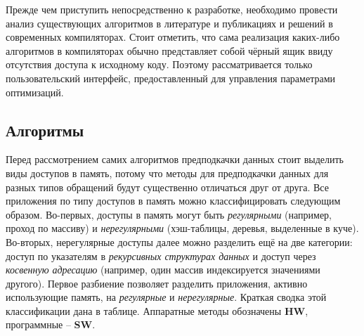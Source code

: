 \documentclass[12pt,a4paper]{article}
\begin{document}
\indent

Прежде чем приступить непосредственно к разработке, необходимо провести анализ существующих алгоритмов в литературе и публикациях и решений в современных компиляторах. Стоит отметить, что сама реализация каких-либо алгоритмов в компиляторах обычно представляет собой чёрный ящик ввиду отсутствия доступа к исходному коду. Поэтому рассматривается только пользовательский интерфейс, предоставленный для управления параметрами оптимизаций.

\subsection{Алгоритмы}

\indent

Перед рассмотрением самих алгоритмов предподкачки данных стоит выделить виды доступов в память, потому что методы для предподкачки данных для разных типов обращений будут существенно отличаться друг от друга. Все приложения по типу доступов в память можно классифицировать следующим образом. Во-первых, доступы в память могут быть \emph{регулярными} (например, проход по массиву) и \emph{нерегулярными} (хэш-таблицы, деревья, выделенные в куче). Во-вторых, нерегулярные доступы далее можно разделить ещё на две категории: доступ по указателям в \emph{рекурсивных структурах данных} и доступ через \emph{косвенную адресацию} (например, один массив индексируется значениями другого). Первое разбиение позволяет разделить приложения, активно использующие память, на \emph{регулярные} и \emph{нерегулярные}. Краткая сводка этой классификации дана в таблице. Аппаратные методы обозначены \textbf{HW}, программные -- \textbf{SW}.
\end{document}
